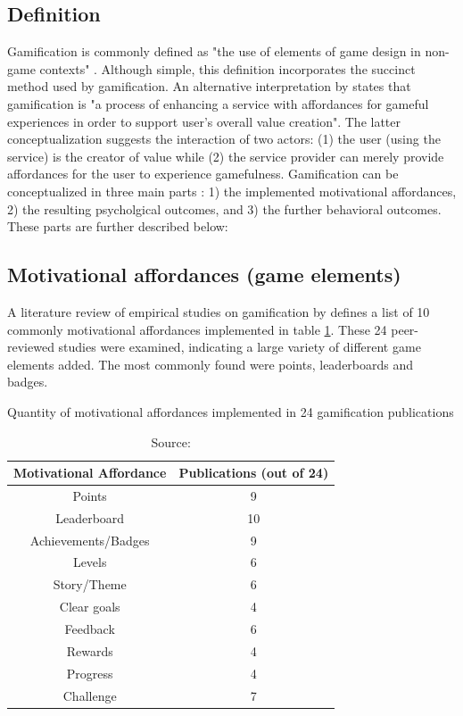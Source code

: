 \subsection{Definition}

Gamification is commonly defined as "the use of elements of game design in non-game contexts" \cite{deterding2011game}. Although simple, this definition incorporates the succinct method used by gamification. An alternative interpretation by \cite{huotari2012defining} states that gamification is "a process of enhancing a service with affordances for gameful experiences in order to support user's overall value creation". The latter conceptualization suggests the interaction of two actors: (1) the user (using the service) is the creator of value while (2) the service provider can merely provide affordances for the user to experience gamefulness. Gamification can be conceptualized in three main parts \cite{hamari2014does}: 1) the implemented motivational affordances, 2) the resulting psycholgical outcomes, and 3) the further behavioral outcomes. These parts are further described below: 

\subsection{Motivational affordances (game elements)}

A literature review of empirical studies on gamification by \cite{hamari2014does} defines a list of 10 commonly motivational affordances implemented in table \ref{tab:motivational-affordances}. These 24 peer-reviewed studies were examined, indicating a large variety of different game elements added. The most commonly found were points, leaderboards and badges.

\begin{table}[h]
    \centering
    \caption{Quantity of motivational affordances implemented in 24 gamification publications}
    \begin{tabular}{|c|c|}
        \hline Motivational Affordance & Publications (out of 24) \\
        \hline Points & 9 \\
        \hline Leaderboard & 10\\ 
        \hline Achievements/Badges & 9 \\
        \hline Levels & 6 \\
        \hline Story/Theme & 6 \\
        \hline Clear goals & 4 \\
        \hline Feedback & 6 \\
        \hline Rewards & 4 \\
        \hline Progress & 4 \\
        \hline Challenge & 7 \\
        \hline
    \end{tabular}
    \caption*{Source: \cite{hamari2014does}}
    \label{tab:motivational-affordances}
\end{table}

